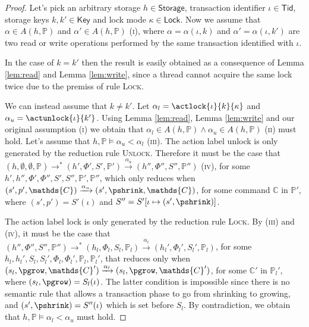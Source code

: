 \begin{proof}
Let's pick an arbitrary storage $h \in \mathsf{Storage}$, transaction identifier $\iota \in \mathsf{Tid}$, storage keys $k, k' \in \mathsf{Key}$ and lock mode $\kappa \in \mathsf{Lock}$. Now we assume that  $\alpha \in A(h, \mathds{P})$ and $\alpha' \in A(h, \mathds{P})$ (\textsc{i}), where $\alpha = \alpha(\iota, k)$ and $\alpha' = \alpha(\iota, k')$ are two read or write operations performed by the same transaction identified with $\iota$.

In the case of $k = k'$ then the result is easily obtained as a consequence of Lemma \ref{lem:read} and Lemma \ref{lem:write}, since a thread cannot acquire the same lock twice due to the premiss of rule \textsc{Lock}.

We can instead assume that $k \neq k'$. Let $\alpha_l = \actlock{\iota}{k}{\kappa}$ and $\alpha_u = \actunlock{\iota}{k'}$. Using Lemma \ref{lem:read}, Lemma \ref{lem:write} and our original assumption (\textsc{i}) we obtain that $\alpha_l \in A(h, \mathds{P}) \land \alpha_u \in A(h, \mathds{P})$ (\textsc{ii}) must hold. Let's assume that $h, \mathds{P} \vDash \alpha_u < \alpha_l$ (\textsc{iii}). The action label \textsf{unlock} is only generated by the reduction rule \textsc{Unlock}. Therefore it must be the case that $(h, \emptyset, \emptyset, \mathds{P}) \rightarrow^* (h', \Phi', S', \mathds{P}') \xrightarrow{\alpha_u} (h'', \Phi'', S'', \mathds{P}'')$ (\textsc{iv}), for some $h', h'', \Phi', \Phi'', S', S'', \mathds{P}', \mathds{P}''$, which only reduces when $(s', p', \mathds{C}) \xrightarrow{\alpha_u} (s', \pshrink, \mathds{C})$, for some command $\mathds{C}$ in $\mathds{P}'$, where $(s', p') = S'(\iota)$ and $S'' = S'[\iota \mapsto (s', \pshrink)]$.

The action label \textsf{lock} is only generated by the reduction rule \textsc{Lock}. By (\textsc{iii}) and (\textsc{iv}), it must be the case that $(h'', \Phi'', S'', \mathds{P}'') \rightarrow^* (h_l, \Phi_l, S_l, \mathds{P}_l) \xrightarrow{\alpha_l} (h_l', \Phi_l', S_l', \mathds{P}_l)$, for some $h_l, h_l', S_l, S_l', \Phi_l, \Phi_l', \mathds{P}_l, \mathds{P}_l'$, that reduces only when $(s_l, \pgrow, \mathds{C}') \xrightarrow{\alpha_l} (s_l, \pgrow, \mathds{C}')$, for some $\mathds{C}'$ in $\mathds{P}_l'$, where $(s_l, \pgrow) = S_l(\iota)$. The latter condition is impossible since there is no semantic rule that allows a transaction phase to go from shrinking to growing, and $(s', \pshrink) = S''(\iota)$ which is set before $S_l$. By contradiction, we obtain that $h, \mathds{P} \vDash \alpha_l < \alpha_u$ must hold.
\end{proof}